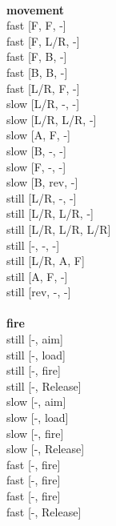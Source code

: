 \ \\ {\bf movement } \\
fast [F, F, -] \\
fast [F, L/R, -] \\
fast [F, B, -] \\
fast [B, B, -] \\
fast [L/R, F, -] \\
slow [L/R, -, -] \\
slow [L/R, L/R, -] \\
slow [A, F, -] \\
slow [B, -, -] \\
slow [F, -, -] \\
slow [B, rev, -] \\
still [L/R, -, -] \\
still [L/R, L/R, -] \\
still [L/R, L/R, L/R] \\
still [-, -, -] \\
still [L/R, A, F] \\
still [A, F, -] \\
still [rev, -, -] \\
\ \\ {\bf fire } \\
still [-, aim] \\
still [-, load] \\
still [-, fire] \\
still [-, Release] \\
slow [-, aim] \\
slow [-, load] \\
slow [-, fire] \\
slow [-, Release] \\
fast [-, fire] \\
fast [-, fire] \\
fast [-, fire] \\
fast [-, Release] \\


